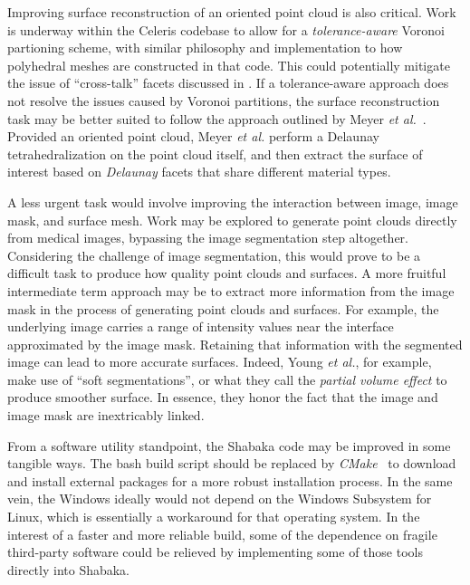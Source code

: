 Improving surface reconstruction of an oriented point cloud is also critical. Work is underway within the Celeris codebase to allow for a \textit{tolerance-aware} Voronoi partioning scheme, with similar philosophy and implementation to how polyhedral meshes are constructed in that code. This could potentially mitigate the issue of ``cross-talk'' facets discussed in . If a tolerance-aware approach does not resolve the issues caused by Voronoi partitions, the surface reconstruction task may be better suited to follow the approach outlined by Meyer \textit{et al.}~\cite{meyer_2008}. Provided an oriented point cloud, Meyer \textit{et al.} perform a Delaunay tetrahedralization on the point cloud itself, and then extract the surface of interest based on \textit{Delaunay} facets that share different material types.

A less urgent task would involve improving the interaction between image, image mask, and surface mesh. Work may be explored to generate point clouds directly from medical images, bypassing the image segmentation step altogether. Considering the challenge of image segmentation, this would prove to be a difficult task to produce how quality point clouds and surfaces. A more fruitful intermediate term approach may be to extract more information from the image mask in the process of generating point clouds and surfaces. For example, the underlying image carries a range of intensity values near the interface approximated by the image mask. Retaining that information with the segmented image can lead to more accurate surfaces. Indeed, Young \textit{et al.}, for example, make use of ``soft segmentations'', or what they call the \textit{partial volume effect} to produce smoother surface. In essence, they honor the fact that the image and image mask are inextricably linked.

From a software utility standpoint, the Shabaka code may be improved in some tangible ways. The bash build script should be replaced by \textit{CMake}~\cite{cmake} to download and install external packages for a more robust installation process. In the same vein, the Windows ideally would not depend on the Windows Subsystem for Linux, which is essentially a workaround for that operating system. In the interest of a faster and more reliable build, some of the dependence on fragile third-party software could be relieved by implementing some of those tools directly into Shabaka.

